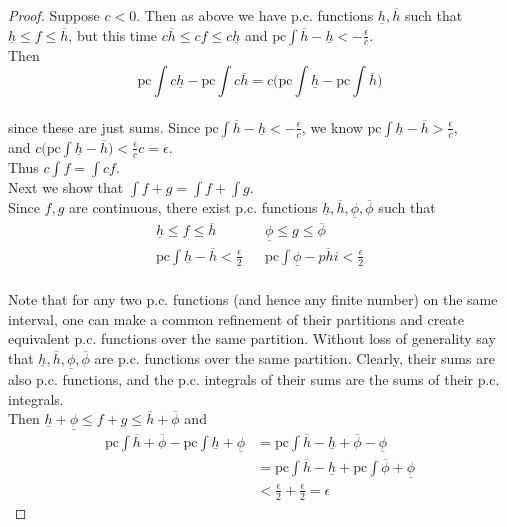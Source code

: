 \documentclass[12pt]{article}
\begin{document}
\begin{proof}
		Suppose $c < 0$. Then as above we have p.c. functions $\underline{h}, \overline{h}$ such that $\underline{h} \leq f \leq \overline{h}$, but this time $c\overline{h} \leq cf \leq c\underline{h}$ and  $\text{pc}\int \overline{h} - \underline{h} < -\frac{\epsilon}{c}$. \\
		Then \\
		$$\text{pc}\int c \underline{h} - \text{pc}\int c \overline{h}  = c \Big(\text{pc}\int  \underline{h} - \text{pc}\int \overline{h} \Big)$$ \\
		since these are just sums. Since $\text{pc}\int \overline{h} - \underline{h} < -\frac{\epsilon}{c}$, we know $\text{pc}\int \underline{h} - \overline{h} > \frac{\epsilon}{c}$, \\
		and $c \big( \text{pc}\int \underline{h} - \overline{h} \big) < \frac{\epsilon}{c}c = \epsilon$. \\
		
		Thus $c \int f = \int cf$. \\
		
		Next we show that $\int f +g = \int f + \int g$. \\
		
		Since $f,g$ are continuous, there exist p.c. functions $\underline{h}, \overline{h}, \underline{\phi}, \overline{\phi}$ such that \\
		\begin{align*}
			\underline{h} \leq f \leq \overline{h} &  &\underline{\phi} \leq g \leq \overline{\phi} \\
			\text{pc}\int \underline{h} - \overline{h} < \frac{\epsilon}{2} &  & \text{pc}\int \underline{\phi} - \overline{phi} < \frac{\epsilon}{2} \\
		\end{align*}
		
		Note that for any two p.c. functions (and hence any finite number) on the same interval, one can make a common refinement of their partitions and create equivalent p.c. functions over the same partition. Without loss of generality say that $\underline{h}, \overline{h}, \underline{\phi}, \overline{\phi}$ are p.c. functions over the same partition. Clearly, their sums are also p.c. functions, and the p.c. integrals of their sums are the sums of their p.c. integrals. \\
		
		Then  $\underline{h} + \underline{\phi} \leq f +g  \leq \overline{h} + \overline{\phi}$ and \\
		\begin{align*}
			\text{pc}\int \overline{h} + \overline{\phi} - \text{pc}\int  \underline{h} + \underline{\phi} & = \text{pc}\int \overline{h} - \underline{h} + \overline{\phi} - \underline{\phi} \\
			& = \text{pc}\int \overline{h} - \underline{h} + \text{pc}\int  \overline{\phi} + \underline{\phi} \\
			& < \frac{\epsilon}{2} +\frac{\epsilon}{2} = \epsilon
		\end{align*}
		

\end{proof}
\end{document}
